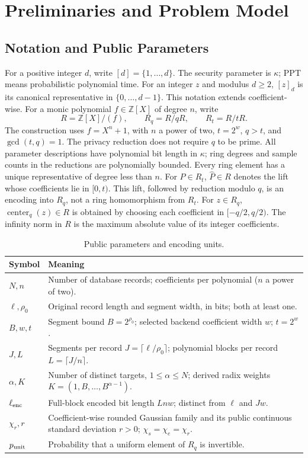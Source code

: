 \section{Preliminaries and Problem Model}
\label{sec:preliminaries}
\subsection{Notation and Public Parameters}
\label{sec:notation-params}
For a positive integer \(d\), write \([d]=\{1,\ldots,d\}\).
The security parameter is \(\kappa\); PPT means probabilistic polynomial time.
For an integer \(z\) and modulus \(d\ge2\), \([z]_d\) is its canonical
representative in \(\{0,\ldots,d-1\}\). This notation extends coefficient-wise.
For a monic polynomial \(f\in\mathbb Z[X]\) of degree \(n\), write
\[
 R=\mathbb Z[X]/(f),\qquad R_q=R/qR,\qquad R_t=R/tR.
\]
The construction uses \(f=X^n+1\), with \(n\) a power of two,
\(t=2^w\), \(q>t\), and \(\gcd(t,q)=1\).
The privacy reduction does not require \(q\) to be prime.
All parameter descriptions have polynomial bit length in \(\kappa\);
ring degrees and sample counts in the reductions are polynomially bounded.
Every ring element has a unique representative of degree less than \(n\).
For \(P\in R_t\), \(\widehat P\in R\) denotes the lift whose coefficients
lie in \([0,t)\). This lift, followed by reduction modulo \(q\), is an
encoding into \(R_q\), not a ring homomorphism from \(R_t\).
For \(z\in R_q\), \(\operatorname{center}_q(z)\in R\) is obtained by choosing
each coefficient in \([-q/2,q/2)\). The infinity norm in \(R\) is the maximum
absolute value of its integer coefficients.

\begin{table}[t]
\centering
\caption{Public parameters and encoding units.}
\label{tab:notation}
\small
\begin{tabular}{@{}lp{8.9cm}@{}}
\toprule
Symbol & Meaning \\
\midrule
\(N,n\) & Number of database records; coefficients per polynomial (\(n\) a power of two). \\
\(\ell,\rho_0\) & Original record length and segment width, in bits; both at least one. \\
\(B,w,t\) & Segment bound \(B=2^{\rho_0}\); selected backend coefficient width \(w\); \(t=2^w\). \\
\(J,L\) & Segments per record \(J=\lceil\ell/\rho_0\rceil\); polynomial blocks per record \(L=\lceil J/n\rceil\). \\
\(\alpha,K\) & Number of distinct targets, \(1\le\alpha\le N\); derived radix weights \(K=(1,B,\ldots,B^{\alpha-1})\). \\
\(\ell_{\rm enc}\) & Full-block encoded bit length \(Lnw\); distinct from \(\ell\) and \(Jw\). \\
\(\chi_r,r\) & Coefficient-wise rounded Gaussian family and its public continuous standard deviation \(r>0\); \(\chi_s=\chi_e=\chi_r\). \\
\(p_{\rm unit}\) & Probability that a uniform element of \(R_q\) is invertible. \\
\bottomrule
\end{tabular}
\end{table}


